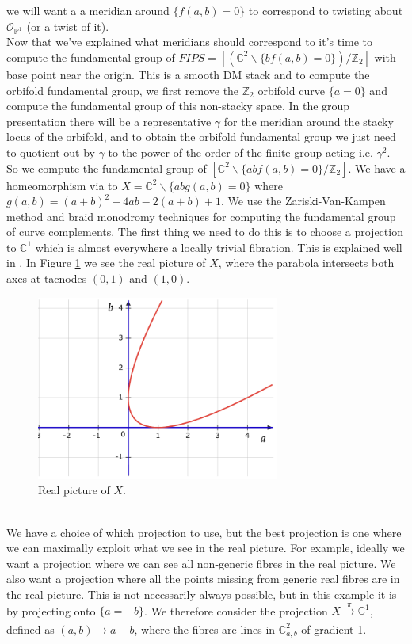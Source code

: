 \documentclass[oneside,reqno]{amsart}
\theoremstyle{definition}
\theoremstyle{definition}
\theoremstyle{definition}
\theoremstyle{definition}
\newcommand{\CC}{\mathbb{C}}
\newcommand{\PP}{\mathbb{P}}
\newcommand{\Z}{\mathbb{Z}}
\newcommand{\Os}{\mathcal{O}}
\begin{document}
we will want a a meridian around $\{ f(a,b)=0\}$ to correspond to twisting about $\Os_{\PP^1}$ (or a twist of it). 
\\
\newline
Now that we've explained what meridians should correspond to it's time to compute the fundamental group of $FIPS=\left[ (\CC^2 \backslash \{bf(a,b)=0\} ) / \Z_2 \right]$ with base point near the origin. This is a smooth DM stack and to compute the orbifold  fundamental group, we first remove the $\Z_2$ orbifold curve $\{ a=0\}$ and compute the fundamental group of this non-stacky space. In the group presentation there will be a representative $\gamma$ for the meridian around the stacky locus of the orbifold, and to obtain the orbifold fundamental group we just need to quotient out by $\gamma$ to the power of the order of the finite group acting i.e. $\gamma^2$.\\
\newline
So we compute the fundamental group of $[\CC^2 \backslash \{abf(a,b)=0\}/\Z_2]$. We have a homeomorphism via to $X = \CC^2 \backslash \{abg(a,b)=0\}$ where $g(a,b)=(a + b )^2 -4ab -2(a + b) +1$. We use the Zariski-Van-Kampen method and braid monodromy techniques for computing the fundamental group of curve complements. The first thing we need to do this is to choose a projection to $\CC^1$ which is almost everywhere a locally trivial fibration. This is explained well in \cite{cogolludo}. In Figure \ref{FIPS1} we see the real picture of $X$, where the parabola intersects both axes at tacnodes $(0,1)$ and $(1,0)$.
\begin{figure}[!h]
    \centering
    \includegraphics[width=8cm]{rank2exmp/FIPS1.png}
    \caption{Real picture of $X$.}
    \label{FIPS1}
\end{figure}
\\
\newline
We have a choice of which projection to use, but the best projection is one where we can maximally exploit what we see in the real picture. For example, ideally we want a projection where we can see all non-generic fibres in the real picture. We also want a projection where all the points missing from generic real fibres are in the real picture. This is not necessarily always possible, but in this example it is by projecting onto $\{ a=-b \}$. We therefore consider the projection $X \xrightarrow[]{\pi} \CC^1$, defined as $(a,b) \mapsto a-b$, where the fibres are lines in $\CC^2_{a,b}$ of gradient 1.
\end{document}
